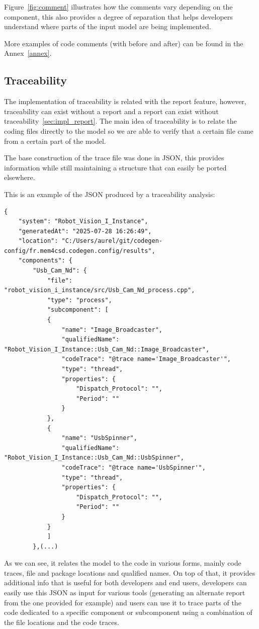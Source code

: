 Figure~\ref{fig:comment} illustrates how the comments vary depending on the component, this also provides a degree of separation that helps developers understand where parts of the input model are being implemented.

More examples of code comments (with before and after) can be found in the Annex~\ref{annex}.


\subsection{Traceability}
\label{sec:impl_trace}

The implementation of traceability is related with the report feature, however, traceability can exist without a report and a report can exist without traceability~\ref{sec:impl_report}. The main idea of traceability is to relate the coding files directly to the model so we are able to verify that a certain file came from a certain part of the model.

The base construction of the trace file was done in JSON, this provides information while still maintaining a structure that can easily be ported elsewhere.

This is an example of the JSON produced by a traceability analysis:

\begin{verbatim}
{
	"system": "Robot_Vision_I_Instance",
	"generatedAt": "2025-07-28 16:26:49",
	"location": "C:/Users/aurel/git/codegen-config/fr.mem4csd.codegen.config/results",
	"components": {
		"Usb_Cam_Nd": {
			"file": "robot_vision_i_instance/src/Usb_Cam_Nd_process.cpp",
			"type": "process",
			"subcomponent": [
			{
				"name": "Image_Broadcaster",
				"qualifiedName": "Robot_Vision_I_Instance::Usb_Cam_Nd::Image_Broadcaster",
				"codeTrace": "@trace name='Image_Broadcaster'",
				"type": "thread",
				"properties": {
					"Dispatch_Protocol": "",
					"Period": ""
				}
			},
			{
				"name": "UsbSpinner",
				"qualifiedName": "Robot_Vision_I_Instance::Usb_Cam_Nd::UsbSpinner",
				"codeTrace": "@trace name='UsbSpinner'",
				"type": "thread",
				"properties": {
					"Dispatch_Protocol": "",
					"Period": ""
				}
			}
			]
		},(...)
\end{verbatim}

As we can see, it relates the model to the code in various forms, mainly code traces, file and package locations and qualified names. On top of that, it provides additional info that is useful for both developers and end users, developers can easily use this \gls{JSON} as input for various tools (generating an alternate report from the one provided for example) and users can use it to trace parts of the code dedicated to a specific component or subcomponent using a combination of the file locations and the code traces.

